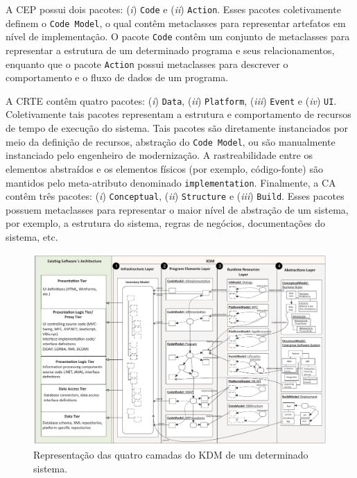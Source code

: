 A CEP possui dois pacotes: (\textit{i}) \texttt{Code} e (\textit{ii}) \texttt{Action}. Esses pacotes coletivamente definem o \texttt{Code Model}, o qual contêm metaclasses para representar artefatos em nível de implementação. O pacote \texttt{Code} contêm um conjunto de metaclasses para representar a estrutura de um determinado programa e seus relacionamentos, enquanto que o pacote \texttt{Action} possui metaclasses para descrever o comportamento e o fluxo de dados de um programa.

A CRTE contêm quatro pacotes: (\textit{i}) \texttt{Data}, (\textit{ii}) \texttt{Platform}, (\textit{iii}) \texttt{Event} e (\textit{iv}) \texttt{UI}. Coletivamente tais pacotes representam a estrutura e comportamento de recursos de tempo de execução do sistema. Tais pacotes são diretamente instanciados por meio da definição de recursos, abstração do \texttt{Code Model}, ou são manualmente instanciado pelo engenheiro de modernização. A rastreabilidade entre os elementos abstraídos e os elementos físicos (por exemplo, código-fonte) são mantidos pelo meta-atributo denominado \texttt{implementation}. Finalmente, a CA contêm três pacotes: (\textit{i}) \texttt{Conceptual}, (\textit{ii}) \texttt{Structure} e (\textit{iii}) \texttt{Build}. Esses pacotes possuem metaclasses para representar o maior nível de abstração de um sistema, por exemplo, a estrutura do sistema, regras de negócios, documentações do sistema, etc.

\begin{figure}[htb]
 \caption{Representação das quatro camadas do KDM de um determinado sistema.}
 \label{fig:kdm_layer_sistema_completo}
 \centering
 \includegraphics[scale=0.6]{images/kdm_Layer.pdf}
 \fautor
\end{figure}

